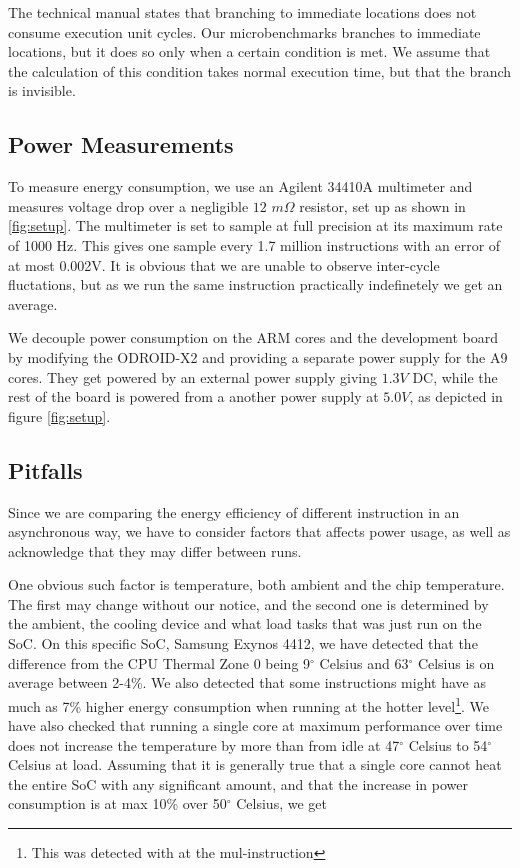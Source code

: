The technical manual states that branching to immediate locations does not
consume execution unit cycles. Our microbenchmarks branches to immediate
locations, but it does so only when a certain condition is met. We assume that
the calculation of this condition takes normal execution time, but that the
branch is invisible.


\subsection{Power Measurements}
To measure energy consumption, we use an Agilent 34410A
multimeter\cite{agilent34410a} and measures voltage drop over a negligible $12$
$m\Omega$ resistor, set up as shown in \autoref{fig:setup}. The multimeter is
set to sample at full precision at its maximum rate of 1000 Hz. This gives one
sample every 1.7 million instructions with an error of at most 0.002V. It is
obvious that we are unable to observe inter-cycle fluctations, but as we run the
same instruction practically indefinetely we get an average.

We decouple power consumption on the ARM cores and the development board by
modifying the ODROID-X2 and providing a separate power supply for the A9 cores.
They get powered by an external power supply giving $1.3V$ DC, while the rest of
the board is powered from a another power supply at $5.0V$, as depicted in
figure \ref{fig:setup}.

\subsection{Pitfalls}
Since we are comparing the energy efficiency of different instruction in an
asynchronous way, we have to consider factors that affects power usage, as well
as acknowledge that they may differ between runs.

\label{sec:temperature}
One obvious such factor is temperature, both ambient and the chip temperature.
The first may change without our notice, and the second one is determined by the
ambient, the cooling device and what load tasks that was just run on the SoC. On
this specific SoC, Samsung Exynos 4412, we have detected that the difference
from the CPU Thermal Zone 0 being 9$^\circ$ Celsius and 63$^\circ$ Celsius is on
average between 2-4\%. We also detected that some instructions might have as
much as 7\% higher energy consumption when running at the hotter
level\footnote{This was detected with at the {\ttfamily mul}-instruction}. We
have also checked that running a single core at maximum performance over time
does not increase the temperature by more than from idle at 47$^\circ$ Celsius
to 54$^\circ$ Celsius at load. Assuming that it is generally true that a single
core cannot heat the entire SoC with any significant amount, and that the
increase in power consumption is at max 10\% over 50$^\circ$ Celsius, we get

